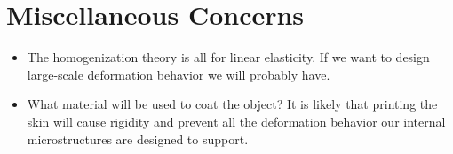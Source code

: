 \documentclass[10pt]{article}
\begin{document}
\section{Miscellaneous Concerns}
\begin{itemize}
    \item The homogenization theory is all for linear elasticity. If we want to
        design large-scale deformation behavior we will probably have.

    \item What material will be used to coat the object? It is likely that
        printing the skin will cause rigidity and prevent all the deformation
        behavior our internal microstructures are designed to support.
\end{itemize}



\end{document}
